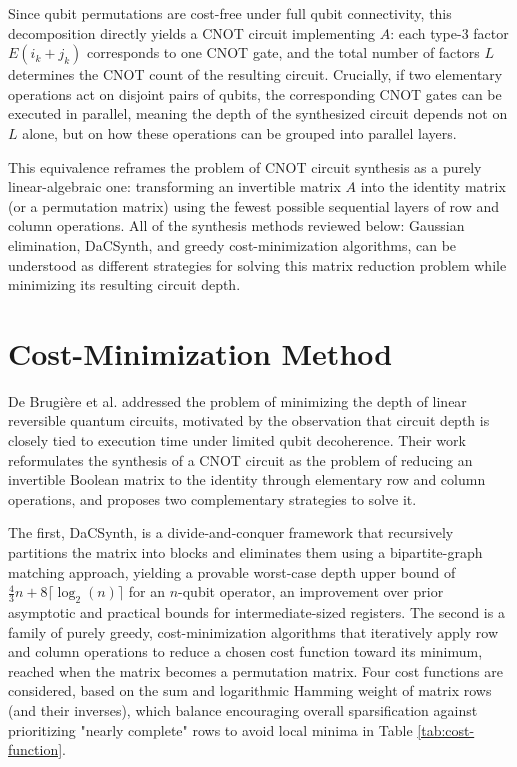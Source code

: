 Since qubit permutations are cost-free under full qubit connectivity, this decomposition directly yields a CNOT circuit implementing $A$: each type-3 factor $E(i_{k} + j_{k})$ corresponds to one CNOT gate, and the total number of factors $L$ determines the CNOT count of the resulting circuit. Crucially, if two elementary operations act on disjoint pairs of qubits, the corresponding CNOT gates can be executed in parallel, meaning the depth of the synthesized circuit depends not on $L$ alone, but on how these operations can be grouped into parallel layers.

This equivalence reframes the problem of CNOT circuit synthesis as a purely linear-algebraic one: transforming an invertible matrix  $A$ into the identity matrix (or a permutation matrix) using the fewest possible sequential layers of row and column operations. All of the synthesis methods reviewed below: Gaussian elimination, DaCSynth, and greedy cost-minimization algorithms, can be understood as different strategies for solving this matrix reduction problem while minimizing its resulting circuit depth.

\section{Cost-Minimization Method}
De Brugière et al. \cite{9475957} addressed the problem of minimizing the depth of linear reversible quantum circuits, motivated by the observation that circuit depth is closely tied to execution time under limited qubit decoherence. Their work reformulates the synthesis of a CNOT circuit as the problem of reducing an invertible Boolean matrix to the identity through elementary row and column operations, and proposes two complementary strategies to solve it.

The first, DaCSynth, is a divide-and-conquer framework that recursively partitions the matrix into blocks and eliminates them using a bipartite-graph matching approach, yielding a provable worst-case depth upper bound of $\frac{4}{3}n + 8\lceil \log_2(n) \rceil$ for an $n$-qubit operator, an improvement over prior asymptotic and practical bounds for intermediate-sized registers. The second is a family of purely greedy, cost-minimization algorithms that iteratively apply row and column operations to reduce a chosen cost function toward its minimum, reached when the matrix becomes a permutation matrix. Four cost functions are considered, based on the sum and logarithmic Hamming weight of matrix rows (and their inverses), which balance encouraging overall sparsification against prioritizing "nearly complete" rows to avoid local minima in Table \ref{tab:cost-function}.

